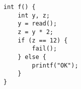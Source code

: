 \begin{minipage}{14cm}
\begin{lstlisting}[style=CStyle, caption=Symbolic Execution Example., label=symbolic]
int f() {
	int y, z;
	y = read();
	z = y * 2;
	if (z == 12) {
		fail();
	} else {
		printf("OK");
	}
}
\end{lstlisting}
\end{minipage}
